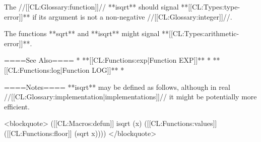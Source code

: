 The //[[CL:Glossary:function]]// **isqrt** should signal **[[CL:Types:type-error]]** if its argument is not a non-negative //[[CL:Glossary:integer]]//.

The functions **sqrt** and **isqrt** might signal **[[CL:Types:arithmetic-error]]**.

====See Also====
  * **[[CL:Functions:exp|Function EXP]]**
  * **[[CL:Functions:log|Function LOG]]**
  * {\secref\FloatSubstitutability}

====Notes====
**isqrt** may be defined as follows, although in real //[[CL:Glossary:implementation|implementations]]// it might be potentially more efficient.

<blockquote>
([[CL:Macros:defun]] isqrt (x) 
  ([[CL:Functions:values]] ([[CL:Functions:floor]] (sqrt x))))
</blockquote> 

